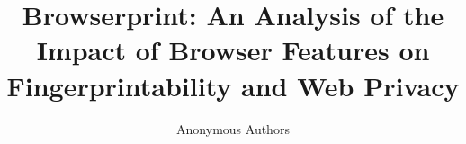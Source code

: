 \documentclass[runningheads]{llncs}
\begin{document}
\title{Browserprint: An Analysis of the Impact of Browser Features on Fingerprintability and Web Privacy}


\author{Anonymous Authors}

\maketitle











\end{document}
